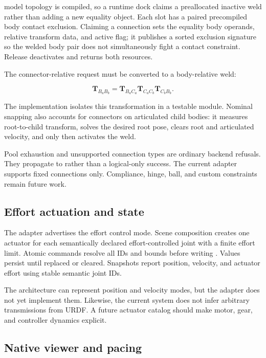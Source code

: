 \mujoco{} model topology is compiled, so a runtime dock claims a preallocated inactive
weld rather than adding a new equality object. Each slot has a paired precompiled body
contact exclusion. Claiming a connection sets the equality body operands, relative
transform data, and active flag; it publishes a sorted exclusion signature so the
welded body pair does not simultaneously fight a contact constraint. Release
deactivates and returns both resources.

The connector-relative request must be converted to a body-relative weld:

\begin{equation}
\mathbf T_{B_aB_b}=
\mathbf T_{B_aC_a}
\mathbf T_{C_aC_b}
\mathbf T_{C_bB_b}.
\label{eq:weld-transform}
\end{equation}

The implementation isolates this transformation in a testable module. Nominal snapping
also accounts for connectors on articulated child bodies: it measures root-to-child
transform, solves the desired root pose, clears root and articulated velocity, and only
then activates the weld.

Pool exhaustion and unsupported connection types are ordinary backend refusals. They
propagate to  rather than a logical-only success. The current adapter
supports fixed connections only. Compliance, hinge, ball, and custom constraints remain
future work.

\subsection{Effort actuation and state}

The adapter advertises the effort control mode. Scene composition creates one actuator
for each semantically declared effort-controlled joint with a finite effort limit.
Atomic commands resolve all IDs and bounds before writing . Values
persist until replaced or cleared. Snapshots report position, velocity, and actuator
effort using stable semantic joint IDs.

The architecture can represent position and velocity modes, but the adapter does not
yet implement them. Likewise, the current system does not infer arbitrary transmissions
from URDF. A future actuator catalog should make motor, gear, and controller dynamics
explicit.

\subsection{Native viewer and pacing}

